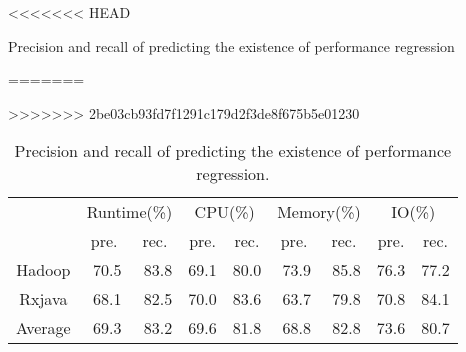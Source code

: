 \begin{table}[]
	\centering
	\footnotesize
<<<<<<< HEAD
	\caption{Precision and recall of predicting the existence of performance regression}
=======
	\caption{Precision and recall of predicting the existence of performance regression.}
>>>>>>> 2be03cb93fd7f1291c179d2f3de8f675b5e01230
	\label{tab:logistic}
	\begin{tabular}{|c|r|r|r|r|r|r|r|r|}
		\hline
		\multicolumn{1}{|l|}{\multirow{2}{*}{}} & \multicolumn{2}{c|}{Runtime(\%)}                      & \multicolumn{2}{c|}{CPU(\%)}                          & \multicolumn{2}{c|}{Memory(\%)}                       & \multicolumn{2}{c|}{IO(\%)}                           \\ \cline{2-9} 
		\multicolumn{1}{|l|}{}                  & \multicolumn{1}{c|}{pre.} & \multicolumn{1}{c|}{rec.} & \multicolumn{1}{c|}{pre.} & \multicolumn{1}{c|}{rec.} & \multicolumn{1}{c|}{pre.} & \multicolumn{1}{c|}{rec.} & \multicolumn{1}{c|}{pre.} & \multicolumn{1}{c|}{rec.} \\ \hline
		Hadoop                                  & 70.5                      & 83.8                      & 69.1                      & 80.0                      & 73.9                      & 85.8                      & 76.3                      & 77.2                      \\ \hline
		Rxjava                                  & 68.1                      & 82.5                      & 70.0                      & 83.6                      & 63.7                      & 79.8                      & 70.8                      & 84.1                      \\ \hline
		Average                                 & 69.3                      & 83.2                      & 69.6                      & 81.8                      & 68.8                      & 82.8                      & 73.6                      & 80.7                      \\ \hline
	\end{tabular}
\end{table}

